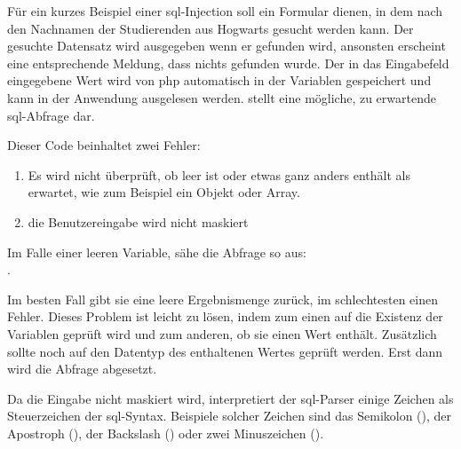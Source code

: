 Für ein kurzes Beispiel einer \gls{sql}-Injection soll ein Formular dienen, in dem nach den Nachnamen der Studierenden aus Hogwarts gesucht werden kann. Der gesuchte Datensatz wird ausgegeben wenn er gefunden wird, ansonsten erscheint eine entsprechende Meldung, dass nichts gefunden wurde. Der in das Eingabefeld eingegebene Wert wird von \gls{php} automatisch in der Variablen  gespeichert und kann in der Anwendung ausgelesen werden.  stellt eine mögliche, zu erwartende \gls{sql}-Abfrage dar.

\begin{listing}[H]
\caption{}
\label{lst:sqlInjections}
\end{listing}

Dieser Code beinhaltet zwei Fehler:

\begin{enumerate}
	\item Es wird nicht überprüft, ob  leer ist oder etwas ganz anders enthält als erwartet, wie zum Beispiel ein Objekt oder Array.
	\item die Benutzereingabe wird nicht maskiert
\end{enumerate}

Im Falle einer leeren Variable, sähe die Abfrage so aus:\\ .

Im besten Fall gibt sie eine leere Ergebnismenge zurück, im schlechtesten einen Fehler. Dieses Problem ist leicht zu lösen, indem zum einen auf die Existenz der Variablen geprüft wird und zum anderen, ob sie einen Wert enthält. Zusätzlich sollte noch auf den Datentyp des enthaltenen Wertes geprüft werden. Erst dann wird die Abfrage abgesetzt.

Da die Eingabe nicht maskiert wird, interpretiert der \gls{sql}-Parser einige Zeichen als Steuerzeichen der \gls{sql}-Syntax. Beispiele solcher Zeichen sind das Semikolon (\pdf{;}), der Apostroph (), der Backslash (\pdf{\textbackslash}) oder zwei Minuszeichen (\pdf{--}).

